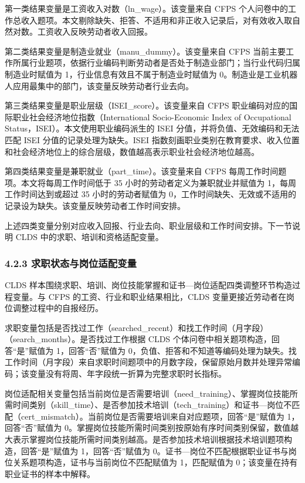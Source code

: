 第一类结果变量是工资收入对数（ln\_wage）。该变量来自 CFPS 个人问卷中的工作总收入题项。本文剔除缺失、拒答、不适用和非正收入记录后，对有效收入取自然对数。工资收入反映劳动者收入回报。

第二类结果变量是制造业就业（manu\_dummy）。该变量来自 CFPS 当前主要工作所属行业题项，依据行业编码判断劳动者是否处于制造业部门；当行业代码归属制造业时赋值为 1，行业信息有效且不属于制造业时赋值为 0。制造业是工业机器人应用最集中的部门，该变量反映劳动者行业去向。

第三类结果变量是职业层级（ISEI\_score）。该变量来自 CFPS 职业编码对应的国际职业社会经济地位指数（International Socio-Economic Index of Occupational Status，ISEI）。本文使用职业编码派生的 ISEI 分值，并将负值、无效编码和无法匹配 ISEI 分值的记录处理为缺失。ISEI 指数刻画职业类别在教育要求、收入位置和社会经济地位上的综合层级，数值越高表示职业社会经济地位越高。

第四类结果变量是兼职就业（part\_time）。该变量来自 CFPS 每周工作时间题项。本文将每周工作时间低于 35 小时的劳动者定义为兼职就业并赋值为 1，每周工作时间达到或超过 35 小时的劳动者赋值为 0，工作时间缺失、无效或不适用的记录设为缺失。该变量反映劳动者工作时间安排。

上述四类变量分别对应收入回报、行业去向、职业层级和工作时间安排。下一节说明 CLDS 中的求职、培训和资格适配变量。

\subsubsection{4.2.3 求职状态与岗位适配变量}\label{ux6c42ux804cux72b6ux6001ux4e0eux5c97ux4f4dux9002ux914dux53d8ux91cf}

CLDS 样本围绕求职、培训、岗位技能掌握和证书---岗位适配四类调整环节构造过程变量。与 CFPS 的工资、行业和职业结果相比，CLDS 变量更接近劳动者在岗位调整过程中的自报经历。

求职变量包括是否找过工作（searched\_recent）和找工作时间（月字段）（search\_months）。是否找过工作根据 CLDS 个体问卷中相关题项构造，回答``是''赋值为 1，回答``否''赋值为 0，负值、拒答和不知道等编码处理为缺失。找工作时间（月字段）来自求职时间题项中的月数字段，保留原始月数并处理异常编码；该变量没有将周、年字段统一折算为完整求职时长指标。

岗位适配相关变量包括当前岗位是否需要培训（need\_training）、掌握岗位技能所需时间类别（skill\_time）、是否参加技术培训（tech\_training）和证书---岗位不匹配（cert\_mismatch）。当前岗位是否需要培训来自对应题项，回答``是''赋值为 1，回答``否''赋值为 0。掌握岗位技能所需时间类别按原始有序时间类别保留，数值越大表示掌握岗位技能所需时间类别越高。是否参加技术培训根据技术培训题项构造，回答``是''赋值为 1，回答``否''赋值为 0。证书---岗位不匹配根据职业证书与岗位关系题项构造，证书与当前岗位不匹配赋值为 1，匹配赋值为 0；该变量在持有职业证书的样本中解释。

